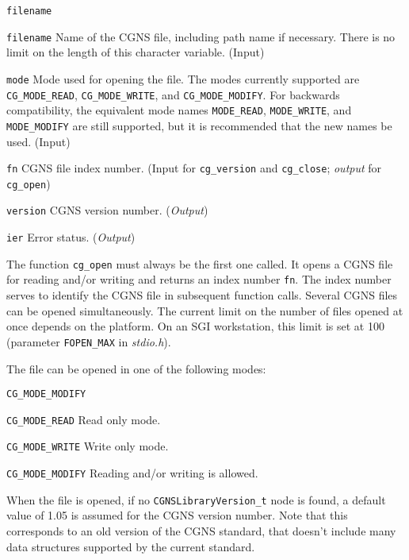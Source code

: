 \begin{Ventryi}{\texttt{filename}}\raggedright
\item [\texttt{filename}]
      Name of the CGNS file, including path name if necessary.
      There is no limit on the length of this character variable.
      (\textcolor{input}{Input})
\item [\texttt{mode}]
      Mode used for opening the file.
      The modes currently supported are \texttt{CG\_MODE\_READ},
      \texttt{CG\_MODE\_WRITE}, and \texttt{CG\_MODE\_MODIFY}.
      For backwards compatibility, the equivalent mode
      names \texttt{MODE\_READ}, \texttt{MODE\_WRITE}, and
      \texttt{MODE\_MODIFY} are still supported, but it is recommended
      that the new names be used.
      (\textcolor{input}{Input})
\item [\texttt{fn}]
      CGNS file index number.
      (\textcolor{input}{Input} for \texttt{cg\_version} and
      \texttt{cg\_close}; \textcolor{output}{\textit{output}} for
      \texttt{cg\_open})
\item [\texttt{version}]
      CGNS version number.
      (\textcolor{output}{\textit{Output}})
\item [\texttt{ier}]
      Error status.
      (\textcolor{output}{\textit{Output}})
\end{Ventryi}

The function \texttt{cg\_open} must always be the first one called.
It opens a CGNS file for reading and/or writing and returns an index
number \texttt{fn}.
The index number serves to identify the CGNS file in subsequent
function calls.
Several CGNS files can be opened simultaneously.
The current limit on the number of files opened at once depends on the
platform.
On an SGI workstation, this limit is set at 100 (parameter
\texttt{FOPEN\_MAX} in \textit{stdio.h}).

The file can be opened in one of the following modes:

\begin{Ventryic}{\texttt{CG\_MODE\_MODIFY}}
\item [\texttt{CG\_MODE\_READ}]
      Read only mode.
\item [\texttt{CG\_MODE\_WRITE}]
      Write only mode.
\item [\texttt{CG\_MODE\_MODIFY}]
      Reading and/or writing is allowed.
\end{Ventryic}

When the file is opened, if no \texttt{CGNSLibraryVersion\_t} node is
found, a default value of 1.05 is assumed for the CGNS version number.
Note that this corresponds to an old version of the CGNS standard, that
doesn't include many data structures supported by the current standard.

